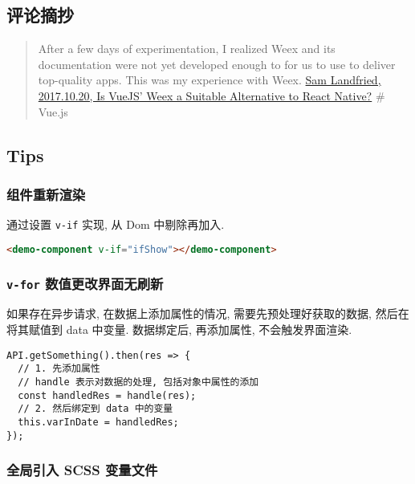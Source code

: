 \subsection{评论摘抄}\label{ux8bc4ux8bbaux6458ux6284}

\begin{quote}
After a few days of experimentation, I realized Weex and its
documentation were not yet developed enough to for us to use to deliver
top-quality apps. This was my experience with Weex.
\href{https://www.bignerdranch.com/blog/is-vuejs-weex-a-suitable-alternative-to-react-native/}{Sam
Landfried, 2017.10.20, Is VueJS' Weex a Suitable Alternative to React
Native?} \# Vue.js
\end{quote}

\subsection{Tips}\label{tips-1}

\subsubsection{组件重新渲染}\label{ux7ec4ux4ef6ux91cdux65b0ux6e32ux67d3}

通过设置 \lstinline!v-if! 实现, 从 Dom 中剔除再加入.

\begin{lstlisting}[language=HTML]
<demo-component v-if="ifShow"></demo-component>
\end{lstlisting}

\subsubsection{\texorpdfstring{\texttt{v-for}
数值更改界面无刷新}{v-for 数值更改界面无刷新}}\label{v-for-ux6570ux503cux66f4ux6539ux754cux9762ux65e0ux5237ux65b0}

如果存在异步请求, 在数据上添加属性的情况, 需要先预处理好获取的数据,
然后在将其赋值到 data 中变量. 数据绑定后, 再添加属性, 不会触发界面渲染.

\begin{lstlisting}
API.getSomething().then(res => {
  // 1. 先添加属性
  // handle 表示对数据的处理, 包括对象中属性的添加
  const handledRes = handle(res);
  // 2. 然后绑定到 data 中的变量
  this.varInDate = handledRes;
});
\end{lstlisting}

\subsubsection{全局引入 SCSS
变量文件}\label{ux5168ux5c40ux5f15ux5165-scss-ux53d8ux91cfux6587ux4ef6}


